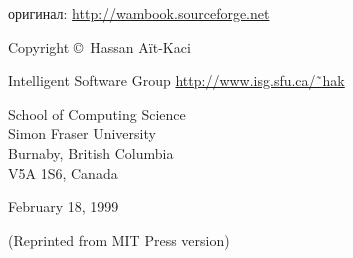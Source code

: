 \maketitle
оригинал: \url{http://wambook.sourceforge.net}

\bigskip
Copyright \copyright\ Hassan A\"it-Kaci 

\bigskip\noindent
Intelligent Software Group
\url{http://www.isg.sfu.ca/˜hak}

\bigskip\noindent
School of Computing Science\\
Simon Fraser University\\
Burnaby, British Columbia\\
V5A 1S6, Canada

\bigskip
February 18, 1999

(Reprinted from MIT Press version)

\clearpage
\tableofcontents
\secdown
